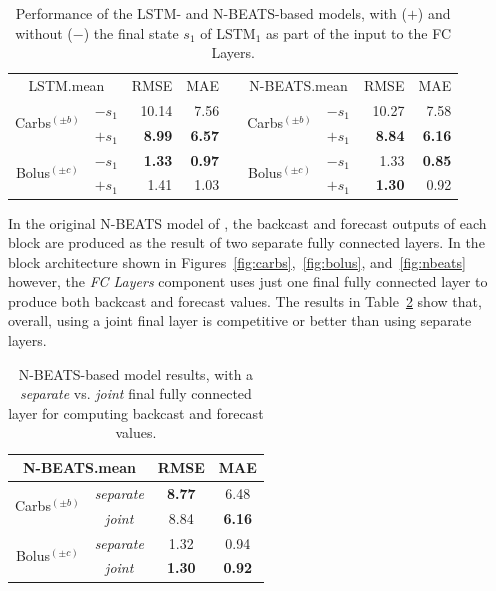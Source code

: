 \documentclass[journal,article,submit,moreauthors,pdftex]{Definitions/mdpi}
\begin{document}
\begin{table}[ht]
\caption{Performance of the LSTM- and N-BEATS-based models, with ($+$) and without ($-$) the final state $s_1$ of LSTM$_{1}$ as part of the input to the FC Layers.}
\begin{center}
\label{tab:ablation_lstm1}
\begin{tabular}{|c|c|rr|c|c|c|rr|}
    \cline{3-4} \cline{8-9}
    \multicolumn{2}{c|}{LSTM.mean} & RMSE & MAE & \multicolumn{1}{c}{} & \multicolumn{2}{c|}{N-BEATS.mean} & RMSE & MAE\\
    \cline{1-4} \cline{6-9}
    \multirow{2}{*}{Carbs$^{(\pm b)}$} & $- s_1$ & 10.14 & 7.56 & & \multirow{2}{*}{Carbs$^{(\pm b)}$} & $- s_1$ & 10.27 & 7.58\\
    & $+ s_1$ & {\bf 8.99} & {\bf 6.57} & & & $+ s_1$ & {\bf 8.84} & {\bf 6.16}\\
    \cline{1-4} \cline{6-9}
    \multirow{2}{*}{Bolus$^{(\pm c)}$} & $- s_1$ & {\bf 1.33} & {\bf 0.97} & & \multirow{2}{*}{Bolus$^{(\pm c)}$} & $- s_1$ & 1.33 & {\bf 0.85}\\
    & $+ s_1$ & 1.41 & 1.03 & & & $+ s_1$ & {\bf 1.30} & 0.92\\
    \cline{1-4} \cline{6-9}
\end{tabular}
\end{center}
\label{tab:state1}
\end{table}

In the original N-BEATS model of \citet{oreshkin:nbeats}, the backcast and forecast outputs of each block are produced as the result of two separate fully connected layers. In the block architecture shown in Figures~\ref{fig:carbs},~\ref{fig:bolus}, and~\ref{fig:nbeats} however, the {\it FC Layers} component uses just one final fully connected layer to produce both backcast and forecast values. The results in Table~\ref{tab:splitting} show that, overall, using a joint final layer is competitive or better than using separate layers.

\begin{table}[ht]
\caption{N-BEATS-based model results, with a {\it separate} vs. {\it joint} final fully connected layer for computing backcast and forecast values.}
\begin{center}
\label{tab:ablation_split}
\begin{tabular}{|c|c|c|c|}
	\cline{3-4}
	\multicolumn{2}{c|}{N-BEATS.mean} & RMSE & MAE\\
	\hline
	\multirow{2}{*}{Carbs$^{(\pm b)}$} & {\it separate} & {\bf 8.77} & 6.48\\
	& {\it joint} & 8.84 & {\bf 6.16}\\
	\hline
	\multirow{2}{*}{Bolus$^{(\pm c)}$} & {\it separate} & 1.32 & 0.94\\
	& {\it joint} & {\bf 1.30} & {\bf 0.92}\\
	\hline
\end{tabular}
\end{center}
\label{tab:splitting}
\end{table}
\end{document}

